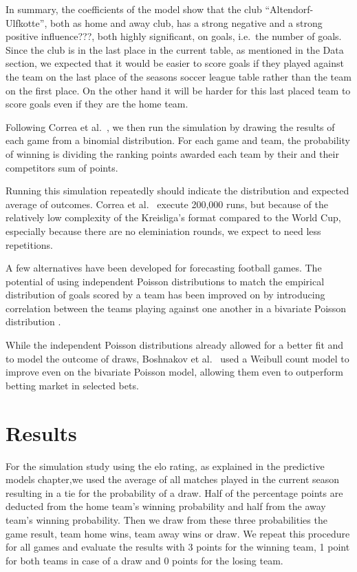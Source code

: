 \documentclass[12pt,a4paper]{article}
\begin{document}
In summary, the coefficients of the model show that the club
\enquote{Altendorf-Ulfkotte}, both as home and away club, has a strong
negative and a strong positive influence???, both highly significant, on
goals, i.e.~the number of goals. Since the club is in the last place in
the current table, as mentioned in the Data section, we expected that it
would be easier to score goals if they played against the team on the
last place of the seasons soccer league table rather than the team on
the first place. On the other hand it will be harder for this last
placed team to score goals even if they are the home team.

Following Correa et al.~\autocite*{correa}, we then run the simulation
by drawing the results of each game from a binomial distribution. For
each game and team, the probability of winning is dividing the ranking
points awarded each team by their and their competitors sum of points.

Running this simulation repeatedly should indicate the distribution and
expected average of outcomes. Correa et al.~\autocite*{correa} execute
200,000 runs, but because of the relatively low complexity of the
Kreisliga's format compared to the World Cup, especially because there
are no eleminiation rounds, we expect to need less repetitions.

A few alternatives have been developed for forecasting football games.
The potential of using independent Poisson distributions to match the
empirical distribution of goals scored by a team has been improved on by
introducing correlation between the teams playing against one another in
a bivariate Poisson distribution \textcite{karlis2003}.

While the independent Poisson distributions already allowed for a better
fit and to model the outcome of draws, Boshnakov et
al.~\autocite*{boshnakov2016} used a Weibull count model to improve even
on the bivariate Poisson model, allowing them even to outperform betting
market in selected bets.

\hypertarget{results}{%
\section{Results}\label{results}}

For the simulation study using the elo rating, as explained in the
predictive models chapter,we used the average of all matches played in
the current season resulting in a tie for the probability of a draw.
Half of the percentage points are deducted from the home team's winning
probability and half from the away team's winning probability. Then we
draw from these three probabilities the game result, team home wins,
team away wins or draw. We repeat this procedure for all games and
evaluate the results with 3 points for the winning team, 1 point for
both teams in case of a draw and 0 points for the losing team.
\end{document}
